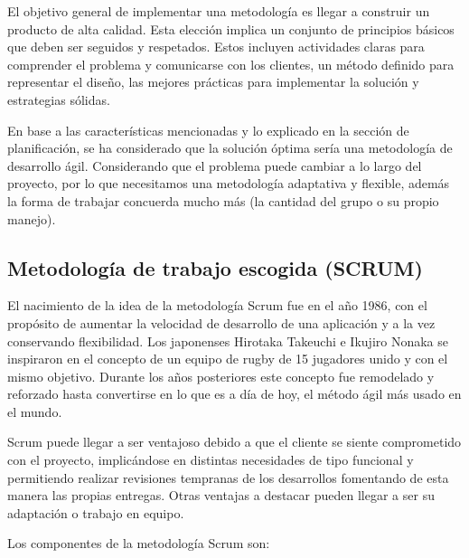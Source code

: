 \vspace{0.3cm}

El objetivo general de implementar una metodología es llegar a construir un producto de alta calidad. Esta elección implica un conjunto de principios básicos que deben ser seguidos y respetados. Estos incluyen actividades claras para comprender el problema y comunicarse con los clientes, un método definido para representar el diseño, las mejores prácticas para implementar la solución y estrategias sólidas. \cite{maida2015metodologias}

\vspace{0.3cm}

En base a las características mencionadas y lo explicado en la sección de planificación, se ha considerado que la solución óptima sería una metodología de desarrollo ágil. Considerando que el problema puede cambiar a lo largo del proyecto, por lo que necesitamos una metodología adaptativa y flexible, además la forma de trabajar concuerda mucho más (la cantidad del grupo o su propio manejo).

\subsection{Metodología de trabajo escogida (SCRUM)}
El nacimiento de la idea de la metodología Scrum fue en el año 1986, con el propósito de aumentar la velocidad de desarrollo de una aplicación y a la vez conservando flexibilidad. Los japonenses Hirotaka Takeuchi e Ikujiro Nonaka  se inspiraron en el concepto de un equipo de rugby de 15 jugadores unido y con el mismo objetivo. Durante los años posteriores este concepto fue remodelado y reforzado hasta convertirse en lo que es a día de hoy, el método ágil más usado en el mundo. \cite{rodriguez2015que}

\vspace{0.3cm}

Scrum puede llegar a ser ventajoso debido a que el cliente se siente comprometido con el proyecto, implicándose en distintas necesidades de tipo funcional y permitiendo realizar revisiones tempranas de los desarrollos fomentando de esta manera las propias entregas. Otras ventajas a destacar pueden llegar a ser su adaptación o trabajo en equipo. \cite{rodriguez2015que}

\vspace{0.3cm}

Los componentes de la metodología Scrum son: \cite{rad2019fundamentos}

